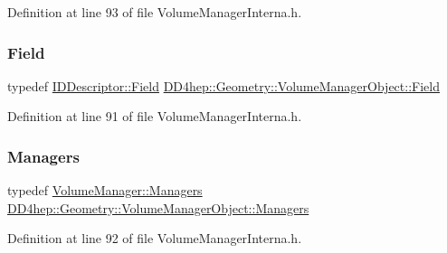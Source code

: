 Definition at line 93 of file Volume\+Manager\+Interna.\+h.

\hypertarget{class_d_d4hep_1_1_geometry_1_1_volume_manager_object_ab214e2fe7df311a4a2e87ec17958790c}{}\label{class_d_d4hep_1_1_geometry_1_1_volume_manager_object_ab214e2fe7df311a4a2e87ec17958790c} 
\subsubsection{\texorpdfstring{Field}{Field}}
{\footnotesize\ttfamily typedef \hyperlink{class_d_d4hep_1_1_geometry_1_1_i_d_descriptor_ac06f5915e74f8a8f2ff73e9a322556e4}{I\+D\+Descriptor\+::\+Field} \hyperlink{class_d_d4hep_1_1_geometry_1_1_volume_manager_object_ab214e2fe7df311a4a2e87ec17958790c}{D\+D4hep\+::\+Geometry\+::\+Volume\+Manager\+Object\+::\+Field}}



Definition at line 91 of file Volume\+Manager\+Interna.\+h.

\hypertarget{class_d_d4hep_1_1_geometry_1_1_volume_manager_object_ad98004850761b06cd3a81c68cdcc0087}{}\label{class_d_d4hep_1_1_geometry_1_1_volume_manager_object_ad98004850761b06cd3a81c68cdcc0087} 
\subsubsection{\texorpdfstring{Managers}{Managers}}
{\footnotesize\ttfamily typedef \hyperlink{class_d_d4hep_1_1_geometry_1_1_volume_manager_ad60f5618f569c6604861b6e0eb1c71c9}{Volume\+Manager\+::\+Managers} \hyperlink{class_d_d4hep_1_1_geometry_1_1_volume_manager_object_ad98004850761b06cd3a81c68cdcc0087}{D\+D4hep\+::\+Geometry\+::\+Volume\+Manager\+Object\+::\+Managers}}



Definition at line 92 of file Volume\+Manager\+Interna.\+h.

\hypertarget{class_d_d4hep_1_1_geometry_1_1_volume_manager_object_a6bbeb958237bc33c7228abada088f6a1}{}\label{class_d_d4hep_1_1_geometry_1_1_volume_manager_object_a6bbeb958237bc33c7228abada088f6a1} 

